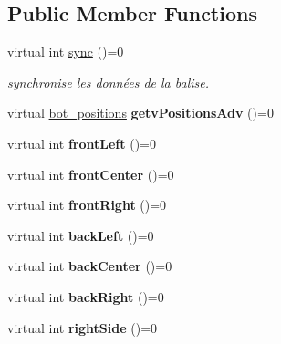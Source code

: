 \subsection*{Public Member Functions}
\begin{DoxyCompactItemize}
\item 
virtual int \hyperlink{classASensorsDriver_a0c581029ba10d5ac820a9e3e2e6883cd}{sync} ()=0
\begin{DoxyCompactList}\small\item\em synchronise les données de la balise. \end{DoxyCompactList}\item 
\mbox{\label{classASensorsDriver_aec164c1aa888bc212ed5c3f986f22767}} 
virtual \hyperlink{classASensorsDriver_a9743a29ef7d4faebd915f096f07bf729}{bot\+\_\+positions} {\bfseries getv\+Positions\+Adv} ()=0
\item 
\mbox{\label{classASensorsDriver_a7873d770e0255d9ef9c4e64d181dccfb}} 
virtual int {\bfseries front\+Left} ()=0
\item 
\mbox{\label{classASensorsDriver_aeda5641a63ce110b5005494fd896ae62}} 
virtual int {\bfseries front\+Center} ()=0
\item 
\mbox{\label{classASensorsDriver_afcf6344268efabb191cb38d7e900e245}} 
virtual int {\bfseries front\+Right} ()=0
\item 
\mbox{\label{classASensorsDriver_a73d2598f685d481a58b3b5364de4f75c}} 
virtual int {\bfseries back\+Left} ()=0
\item 
\mbox{\label{classASensorsDriver_a424c48415ec72021509c58cd4ce95fd8}} 
virtual int {\bfseries back\+Center} ()=0
\item 
\mbox{\label{classASensorsDriver_afa92806f01cf2a920183fb0cb491101e}} 
virtual int {\bfseries back\+Right} ()=0
\item 
\mbox{\label{classASensorsDriver_a08927084e26b430add29c87f05616bf8}} 
virtual int {\bfseries right\+Side} ()=0
\item 
\mbox{\label{classASensorsDriver_a800cc3f2ce33b02a9c9a758308d9e53c}} 

\end{DoxyCompactItemize}
